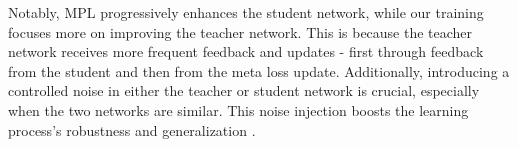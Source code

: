 Notably, MPL progressively enhances the student network, while our training focuses more on improving the teacher network. This is because the teacher network receives more frequent feedback and updates - first through feedback from the student and then from the meta loss update. Additionally, introducing a controlled noise in either the teacher or student network is crucial, especially when the two networks are similar. This noise injection boosts the learning process's robustness and generalization \cite{wang2023consistent, li2024nicest}.